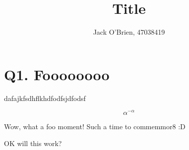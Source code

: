 \documentclass[12pt]{article}
\title{Title}
\author{Jack O'Brien, 47038419}
\date{}
\begin{document}
\maketitle

\section*{Q1. Foooooooo}

dafajkfsdhflkhdfodfsjdfodsf

$$\alpha^{-\alpha}$$

Wow, what a foo moment! Such a time to commemmor8 :D

OK will this work? 
\end{document}
